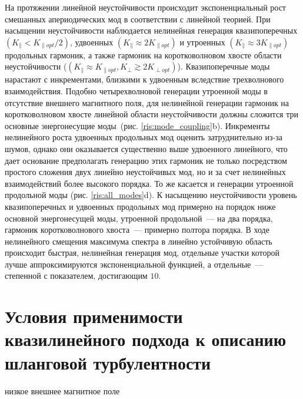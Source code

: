 На протяжении линейной неустойчивости происходит экспоненциальный рост смешанных апериодических мод в соответствии с линейной теорией. При насыщении неустойчивости наблюдается нелинейная генерация квазипоперечных $\left(K_\|<K_{\|opt}/2\right)$, удвоенных $\left(K_\|\approx2K_{\|opt}\right)$ и утроенных $\left(K_\|\approx3K_{\|opt}\right)$ продольных гармоник, а также гармоник на коротковолновом хвосте области неустойчивости ($\left(K_\|\approx K_{\|opt},K_\perp\gtrsim2K_{\perp opt}\right)$). Квазипоперечные моды нарастают с инкрементами, близкими к удвоенным вследствие трехволнового взаимодействия. Подобно четырехволновой генерации утроенной моды в отсутствие внешнего магнитного поля, для нелинейной генерации гармоник на коротковолновом хвосте линейной области неустойчивости должны сложится три основные энергонесущие моды~(рис. \ref{ris:mode_coupling}b). Инкременты нелинейного роста удвоенных продольных мод оценить затруднительно из-за шумов, однако они оказывается существенно выше удвоенного линейного, что дает основание предполагать генерацию этих гармоник не только посредством простого сложения двух линейно неустойчивых мод, но и за счет нелинейных взаимодействий более высокого порядка. То же касается и генерации утроенной продольной моды (рис. \ref{ris:all_modes}d). К насыщению неустойчивости уровень квазипоперечных и удвоенных продольных мод примерно на порядок ниже основной энергонесущей моды, утроенной продольной~--- на два порядка, гармоник коротковолнового хвоста~--- примерно полтора порядка. В ходе нелинейного смещения максимума спектра в линейно устойчивую область происходит быстрая, нелинейная генерация мод, отдельные участки которой лучше аппроксимируются экспоненциальной функцией, а отдельные~--- степенной с показателем, достигающим $10$. 
\section{Условия применимости квазилинейного подхода к описанию шланговой турбулентности} 
низкое внешнее магнитное поле